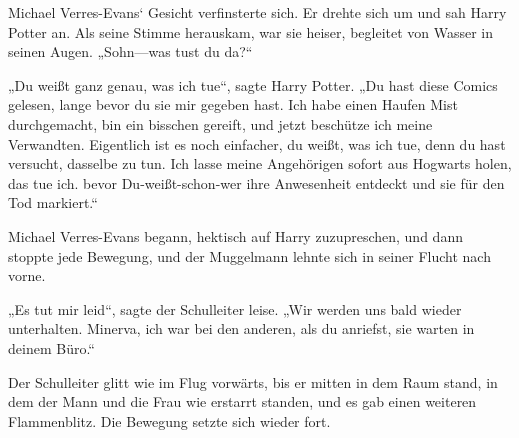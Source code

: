 Michael Verres-Evans‘ Gesicht verfinsterte sich. Er drehte sich um und sah Harry Potter an. Als seine Stimme herauskam, war sie heiser, begleitet von Wasser in seinen Augen. „Sohn—was tust du da?“

„Du weißt ganz genau, was ich tue“, sagte Harry Potter. „Du hast diese Comics gelesen, lange bevor du sie mir gegeben hast. Ich habe einen Haufen Mist durchgemacht, bin ein bisschen gereift, und jetzt beschütze ich meine Verwandten. Eigentlich ist es noch einfacher, du weißt, was ich tue, denn du hast versucht, dasselbe zu tun. Ich lasse meine Angehörigen sofort aus Hogwarts holen, das tue ich. bevor Du-weißt-schon-wer ihre Anwesenheit entdeckt und sie für den Tod markiert.“

Michael Verres-Evans begann, hektisch auf Harry zuzupreschen, und dann stoppte jede Bewegung, und der Muggelmann lehnte sich in seiner Flucht nach vorne.

„Es tut mir leid“, sagte der Schulleiter leise. „Wir werden uns bald wieder unterhalten. Minerva, ich war bei den anderen, als du anriefst, sie warten in deinem Büro.“


Der Schulleiter glitt wie im Flug vorwärts, bis er mitten in dem Raum stand, in dem der Mann und die Frau wie erstarrt standen, und es gab einen weiteren Flammenblitz. Die Bewegung setzte sich wieder fort.

